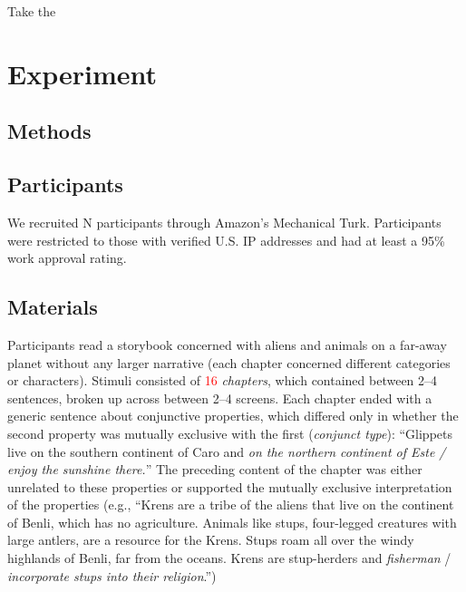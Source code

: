 \documentclass[10pt,letterpaper]{article}
\providecommand{\tightlist}{%
  \setlength{\itemsep}{0pt}\setlength{\parskip}{0pt}}
\newcommand{\denote}[1]{\mbox{ $[\![ #1 ]\!]$}}
\newcommand{\red}[1]{{\textcolor{Red}{#1}}}
\begin{document}
Take the 


%


\section{Experiment}

\subsection{Methods}

\subsection{Participants}
We recruited N participants through Amazon's Mechanical Turk.
Participants were restricted to those with verified U.S. IP addresses and had at least a 95\% work approval rating. 


\subsection{Materials}

Participants read a storybook concerned with aliens and animals on a far-away planet without any larger narrative (each chapter concerned different categories or characters).
Stimuli consisted of \red{16} \emph{chapters}, which contained between 2--4 sentences, broken up across between 2--4 screens.
Each chapter ended with a generic sentence about conjunctive properties, which differed only in whether the second property was mutually exclusive with the first (\emph{conjunct type}): ``Glippets live on the southern continent of Caro and \emph{on the northern continent of Este /  enjoy the sunshine there.}''
The preceding content of the chapter was either unrelated to these properties or supported the mutually exclusive interpretation of the properties (e.g., ``Krens are a tribe of the aliens that live on the continent of Benli, which has no agriculture. Animals like stups, four-legged creatures with large antlers, are a resource for the Krens. Stups roam all over the windy highlands of Benli, far from the oceans. Krens are stup-herders and \emph{fisherman} / \emph{incorporate stups into their religion}.'')
\end{document}
